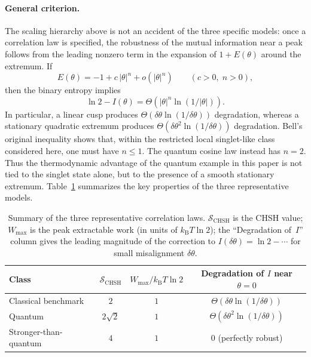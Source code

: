 \documentclass[pra,twocolumn,showpacs,preprintnumbers,amsmath,amssymb,longbibliography,
               superscriptaddress]{revtex4-2}
\begin{document}
{\paragraph{General criterion.}
The scaling hierarchy above is not an accident of the three specific
models: once a correlation law is specified, the robustness of the
mutual information near a peak follows from the leading nonzero term in
the expansion of $1+E(\theta)$ around the extremum.
If
\[
E(\theta) = -1 + c\,|\theta|^n + o(|\theta|^n)
\qquad (c>0,\; n>0),
\]
then the binary entropy implies
\begin{equation}
\ln 2 - I(\theta)
= \Theta(|\theta|^n \ln(1/|\theta|)).
\label{eq:general_scaling}
\end{equation}
In particular, a linear cusp produces
$\Theta(\delta\theta\ln(1/\delta\theta))$ degradation, whereas a
stationary quadratic extremum produces
$\Theta(\delta\theta^2\ln(1/\delta\theta))$ degradation.
Bell's original inequality shows that, within the restricted local
singlet-like class considered here, one must have $n\le 1$.
The quantum cosine law instead has $n=2$.
Thus the thermodynamic advantage of the quantum example in this paper is
not tied to the singlet state alone, but to the presence of a smooth
stationary extremum.
Table~\ref{tab:summary} summarizes the key properties of the three
representative models.}

\begin{table}[t]
\caption{\label{tab:summary}
{Summary of the three representative correlation laws.
$\mathcal{S}_{\mathrm{CHSH}}$ is the CHSH value;
$W_{\max}$ is the peak extractable work
(in units of $k_{\mathrm{B}}T\ln 2$);
the ``Degradation of~$I$'' column gives the leading magnitude of the
correction to
$I(\delta\theta) = \ln 2 - \cdots$ for small misalignment
$\delta\theta$.}}
\begin{ruledtabular}
\begin{tabular}{lccc}
{Class} & {$\mathcal{S}_{\mathrm{CHSH}}$}
      & {$W_{\max}/k_{\mathrm{B}}T\ln 2$}
      & {Degradation of $I$ near $\theta{=}0$} \\
\midrule
{Classical benchmark} & {$2$}
  & {$1$} & {$\Theta(\delta\theta\ln(1/\delta\theta))$} \\
{Quantum} & {$2\sqrt{2}$}
  & {$1$} & {$\Theta(\delta\theta^{2}\ln(1/\delta\theta))$} \\
{Stronger-than-quantum} & {$4$}
  & {$1$} & {$0$ \;(perfectly robust)} \\
\end{tabular}
\end{ruledtabular}
\end{table}
\end{document}
